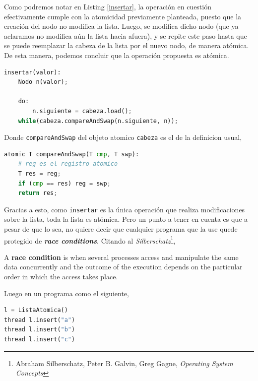 \documentclass[a4paper]{article}
\begin{document}
Como podremos notar en Listing \ref{insertar}, la operación en cuestión efectivamente cumple con la atomicidad previamente planteada, puesto que la creación del nodo no modifica la lista. Luego, se modifica dicho nodo (que ya aclaramos no modifica aún la lista hacia afuera), y se repite este paso hasta que se puede reemplazar la cabeza de la lista por el nuevo nodo, de manera atómica. De esta manera, podemos concluir que la operación propuesta es atómica.

\begin{lstlisting}[language=python, label=insertar, caption=Pseudocódigo de insertar]
insertar(valor):
    Nodo n(valor);

    do:
        n.siguiente = cabeza.load();
    while(cabeza.compareAndSwap(n.siguiente, n));
\end{lstlisting}

Donde \texttt{compareAndSwap} del objeto atomico \texttt{cabeza} es el de la definicion usual,

\begin{lstlisting}[language=python, label=CAS, caption=Pseudocoidgo de Compare And Swap]
atomic T compareAndSwap(T cmp, T swp):
    # reg es el registro atomico
    T res = reg;
    if (cmp == res) reg = swp;
    return res;
\end{lstlisting}

Gracias a esto, como \texttt{insertar} es la única operación que realiza modificaciones sobre la lista, toda la lista es atómica. Pero un punto a tener en cuenta es que a pesar de que lo sea, no quiere decir que cualquier programa que la use quede protegido de \textbf{\textit{race conditions}}. Citando al \textit{Silberschatz}\footnote{Abraham Silberschatz, Peter B. Galvin, Greg Gagne, \textit{Operating System Concepts}},

\begin{displayquote}
    A \textbf{race condition} is when several processes access and manipulate the same data concurrently and the outcome of the execution depends on the particular order in which the access takes place.
\end{displayquote}

Luego en un programa como el siguiente,

\begin{lstlisting}[language=python, caption=Programa con race conditions]
l = ListaAtomica()
thread l.insert("a")
thread l.insert("b")
thread l.insert("c")
\end{lstlisting}
\end{document}
